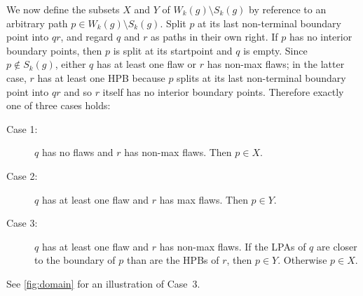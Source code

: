 \documentclass[11pt]{article}
\theoremstyle{definition} %
\numberwithin{equation}{section}
\begin{document}
We now define the subsets $X$ and $Y$ of ${W_k(g) \setminus S_k(g)}$ by reference to an arbitrary path $p \in {W_k(g) \setminus S_k(g)}$.
Split $p$ at its last non-terminal boundary point into $q r$, and regard $q$ and $r$ as paths in their own right.  If $p$ has no interior boundary points, then $p$ is split at its startpoint and $q$ is empty. 
Since $p \notin S_k(g)$, either $q$ has at least one flaw or $r$ has non-max flaws; in the latter case, $r$ has at least one HPB because $p$ splits at its last non-terminal boundary point into $q r$ and so $r$ itself has no interior boundary points.  Therefore exactly one of three cases holds:
\begin{description}
    \item[Case 1:] 
    $q$ has no flaws and $r$ has non-max flaws.
    Then $p \in X$.
        
    \item[Case 2:] 
    $q$ has at least one flaw and $r$ has max flaws.   
    Then $p \in Y$.        
    \item[Case 3:] 
    $q$ has at least one flaw and $r$ has non-max flaws.
    If the LPAs of $q$ are closer to the boundary of $p$ than are the HPBs of $r$, then $p \in Y$. Otherwise $p \in X$.
\end{description}

See \cref{fig:domain} for an illustration of Case~$3$.
\end{document}
